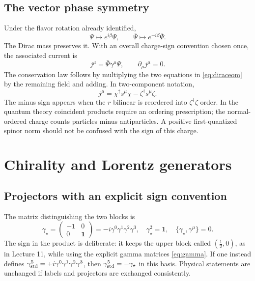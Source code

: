 \documentclass[11pt]{article}
\newcommand{\one}{\mathbf 1}
\begin{document}
\subsection{The vector phase symmetry}
Under the flavor rotation already identified,
\begin{equation}
 \Psi\mapsto e^{i\beta}\Psi,\qquad
 \bar\Psi\mapsto e^{-i\beta}\bar\Psi.
 \label{eq:phase}
\end{equation}
The Dirac mass preserves it. With an overall charge-sign convention
chosen once, the associated current is
\begin{equation}
 j^\mu=\bar\Psi\gamma^\mu\Psi,
 \qquad \partial_\mu j^\mu=0.
 \label{eq:current}
\end{equation}
The conservation law follows by multiplying the two equations in
\eqref{eq:diraceom} by the remaining field and adding.
In two-component notation,
\begin{equation}
 j^\mu=\chi^\dagger s^\mu\chi-\zeta^\dagger s^\mu\zeta.
 \label{eq:currenttwo}
\end{equation}
The minus sign appears when the \(r\) bilinear is reordered into
\(\zeta^\dagger\zeta\) order. In the quantum theory coincident
products require an ordering prescription; the normal-ordered charge
counts particles minus antiparticles. A positive first-quantized
spinor norm should not be confused with the sign of this charge.

\section{Chirality and Lorentz generators}
\subsection{Projectors with an explicit sign convention}
The matrix distinguishing the two blocks is
\begin{equation}
 \gamma_\star=\begin{pmatrix}-\one&0\\0&\one\end{pmatrix}
             =-i\gamma^0\gamma^1\gamma^2\gamma^3,
 \quad \gamma_\star^2=\one,\quad
 \{\gamma_\star,\gamma^\mu\}=0.
 \label{eq:chirality}
\end{equation}
The sign in the product is deliberate: it keeps the upper block
called \((\tfrac12,0)\), as in Lecture 11, while using the explicit
gamma matrices \eqref{eq:gamma}. If one instead defines
\(\gamma^5_{\rm std}=+i\gamma^0\gamma^1\gamma^2\gamma^3\), then
\(\gamma^5_{\rm std}=-\gamma_\star\) in this basis. Physical
statements are unchanged if labels and projectors are exchanged
consistently.
\end{document}
